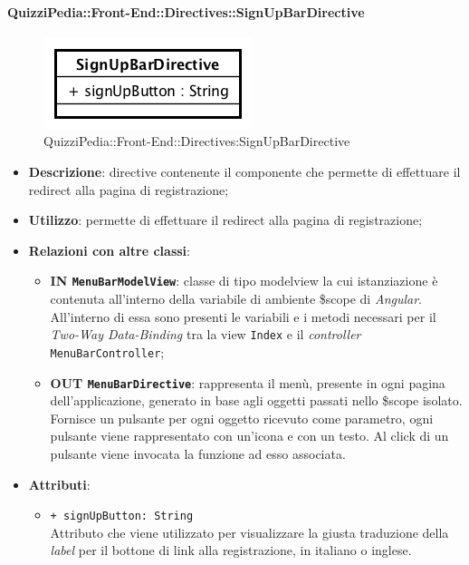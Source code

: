 \paragraph{QuizziPedia::Front-End::Directives::SignUpBarDirective}

\label{QuizziPedia::Front-End::Directives::SignUpBarDirective}
\begin{figure} [ht]
	\centering
	\includegraphics[scale=0.80]{UML/Classi/Front-End/QuizziPedia_Front-end_Directives_SignUpBarDirective.png}
	\caption{QuizziPedia::Front-End::Directives:SignUpBarDirective}
\end{figure} \FloatBarrier
\begin{itemize}
	\item \textbf{Descrizione}: directive contenente il componente che permette di effettuare il redirect alla pagina di registrazione;
	\item \textbf{Utilizzo}: permette di effettuare il redirect alla pagina di registrazione;
	\item \textbf{Relazioni con altre classi}:
	\begin{itemize}
		\item \textbf{IN \texttt{MenuBarModelView}}: classe di tipo modelview la cui istanziazione è contenuta all'interno della variabile di ambiente \$scope di \textit{Angular}. All'interno di essa sono presenti le variabili e i metodi necessari per il \textit{Two-Way Data-Binding} tra la view \texttt{Index} e il \textit{controller} \texttt{MenuBarController};
		\item \textbf{OUT \texttt{MenuBarDirective}}: rappresenta il menù, presente in ogni pagina dell'applicazione, generato in base agli oggetti passati nello \$scope isolato. Fornisce un pulsante per ogni oggetto ricevuto come parametro, ogni pulsante viene rappresentato con un’icona e con un testo. Al click di un pulsante viene invocata la funzione ad esso associata.  
	\end{itemize}
	\item \textbf{Attributi}:
	\begin{itemize}
		\item \texttt{+ signUpButton: String} \\ Attributo che viene utilizzato per visualizzare la giusta traduzione della \textit{label} per il bottone di link alla registrazione, in italiano o inglese.
	\end{itemize}
\end{itemize}